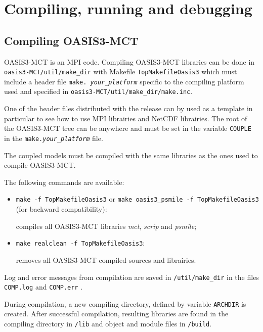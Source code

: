 \newpage
%

\chapter{Compiling, running and debugging}
\label{sec_compilationrunning}

\section{Compiling OASIS3-MCT}
\label{subsec_compile}

OASIS3-MCT is an MPI code. Compiling OASIS3-MCT libraries can be done
in {\tt oasis3-MCT/util/make\_dir} with Makefile {\tt TopMakefileOasis3}
which must include a header file {\tt make.{\it
    your\_platform}} specific to the compiling platform used and
specified in {\tt oasis3-MCT/util/make\_dir/make.inc}.  

One of the
header files distributed with the release can by used as a template
in particular to see how to use MPI librairies and NetCDF librairies.
The root of the OASIS3-MCT tree can be anywhere and must be set in the
variable {\tt COUPLE} in the {\tt make.{\it your\_platform}} file.

The coupled models must be compiled with the same libraries as the ones
used to compile OASIS3-MCT.

The following commands are available:

\begin{itemize}
\item {\tt make -f TopMakefileOasis3} or {\tt make oasis3\_psmile -f
    TopMakefileOasis3} (for backward compatibility):

  compiles all OASIS3-MCT libraries {\it mct}, {\it scrip} and {\it
    psmile};

\item {\tt make realclean -f TopMakefileOasis3}:

  removes all OASIS3-MCT compiled sources and librairies.

\end{itemize}

Log and error messages from compilation are saved in {\tt /util/make\_dir} in the files
{\tt COMP.log} and {\tt COMP.err} .

During compilation, a new compiling directory, defined by variable
{\tt ARCHDIR} is created.  After successful compilation, resulting
libraries are found in the compiling directory in {\tt /lib} and
object and module files in {\tt /build}. 


